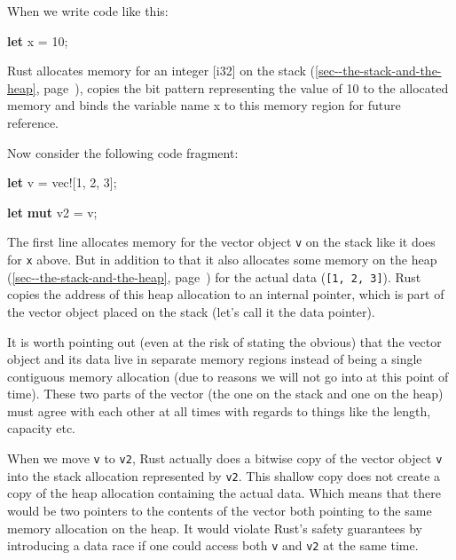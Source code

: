 \documentclass[a4paper,]{book}
\renewcommand*{\hyperref}[2][\ar]{%
  \def\ar{#2}%
  #2 (\autoref{#1}, page~\pageref{#1})}
\newenvironment{Shaded}{\begin{snugshade}}{\end{snugshade}}
\newcommand{\KeywordTok}[1]{\textcolor[rgb]{0.13,0.29,0.53}{\textbf{{#1}}}}
\newcommand{\DecValTok}[1]{\textcolor[rgb]{0.00,0.00,0.81}{{#1}}}
\newcommand{\OtherTok}[1]{\textcolor[rgb]{0.56,0.35,0.01}{{#1}}}
\newcommand{\NormalTok}[1]{{#1}}
\begin{document}
When we write code like this:

\begin{Shaded}
\begin{Highlighting}[]
\KeywordTok{let} \NormalTok{x = }\DecValTok{10}\NormalTok{;}
\end{Highlighting}
\end{Shaded}

Rust allocates memory for an integer {[}i32{]} on the
\hyperref[sec--the-stack-and-the-heap]{stack}, copies the bit pattern
representing the value of 10 to the allocated memory and binds the
variable name x to this memory region for future reference.

Now consider the following code fragment:

\begin{Shaded}
\begin{Highlighting}[]
\KeywordTok{let} \NormalTok{v = }\OtherTok{vec!}\NormalTok{[}\DecValTok{1}\NormalTok{, }\DecValTok{2}\NormalTok{, }\DecValTok{3}\NormalTok{];}

\KeywordTok{let} \KeywordTok{mut} \NormalTok{v2 = v;}
\end{Highlighting}
\end{Shaded}

The first line allocates memory for the vector object \texttt{v} on the
stack like it does for \texttt{x} above. But in addition to that it also
allocates some memory on the
\hyperref[sec--the-stack-and-the-heap]{heap} for the actual data
(\texttt{{[}1,\ 2,\ 3{]}}). Rust copies the address of this heap
allocation to an internal pointer, which is part of the vector object
placed on the stack (let's call it the data pointer).

It is worth pointing out (even at the risk of stating the obvious) that
the vector object and its data live in separate memory regions instead
of being a single contiguous memory allocation (due to reasons we will
not go into at this point of time). These two parts of the vector (the
one on the stack and one on the heap) must agree with each other at all
times with regards to things like the length, capacity etc.

When we move \texttt{v} to \texttt{v2}, Rust actually does a bitwise
copy of the vector object \texttt{v} into the stack allocation
represented by \texttt{v2}. This shallow copy does not create a copy of
the heap allocation containing the actual data. Which means that there
would be two pointers to the contents of the vector both pointing to the
same memory allocation on the heap. It would violate Rust's safety
guarantees by introducing a data race if one could access both
\texttt{v} and \texttt{v2} at the same time.
\end{document}

